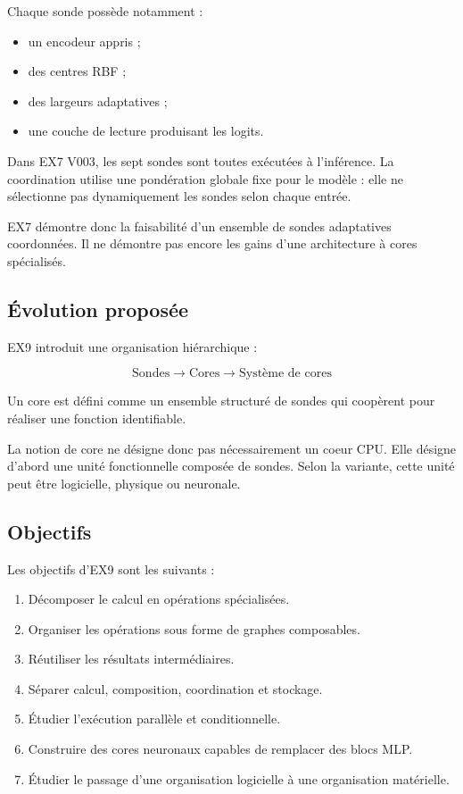 \documentclass[11pt,a4paper]{article}
\begin{document}
Chaque sonde possède notamment :
\begin{itemize}
  \item un encodeur appris ;
  \item des centres RBF ;
  \item des largeurs adaptatives ;
  \item une couche de lecture produisant les logits.
\end{itemize}

Dans EX7 V003, les sept sondes sont toutes exécutées à l'inférence.
La coordination utilise une pondération globale fixe pour le modèle :
elle ne sélectionne pas dynamiquement les sondes selon chaque entrée.

EX7 démontre donc la faisabilité d'un ensemble de sondes adaptatives
coordonnées. Il ne démontre pas encore les gains d'une architecture
à cores spécialisés.

\subsection{Évolution proposée}

EX9 introduit une organisation hiérarchique :

\[
\boxed{
\text{Sondes}
\longrightarrow
\text{Cores}
\longrightarrow
\text{Système de cores}
}
\]

Un core est défini comme un ensemble structuré de sondes qui coopèrent
pour réaliser une fonction identifiable.

La notion de core ne désigne donc pas nécessairement un coeur CPU.
Elle désigne d'abord une unité fonctionnelle composée de sondes.
Selon la variante, cette unité peut être logicielle, physique ou
neuronale.

\subsection{Objectifs}

Les objectifs d'EX9 sont les suivants :

\begin{enumerate}
  \item Décomposer le calcul en opérations spécialisées.
  \item Organiser les opérations sous forme de graphes composables.
  \item Réutiliser les résultats intermédiaires.
  \item Séparer calcul, composition, coordination et stockage.
  \item Étudier l'exécution parallèle et conditionnelle.
  \item Construire des cores neuronaux capables de remplacer des
        blocs MLP.
  \item Étudier le passage d'une organisation logicielle à une
        organisation matérielle.
\end{enumerate}
\end{document}
